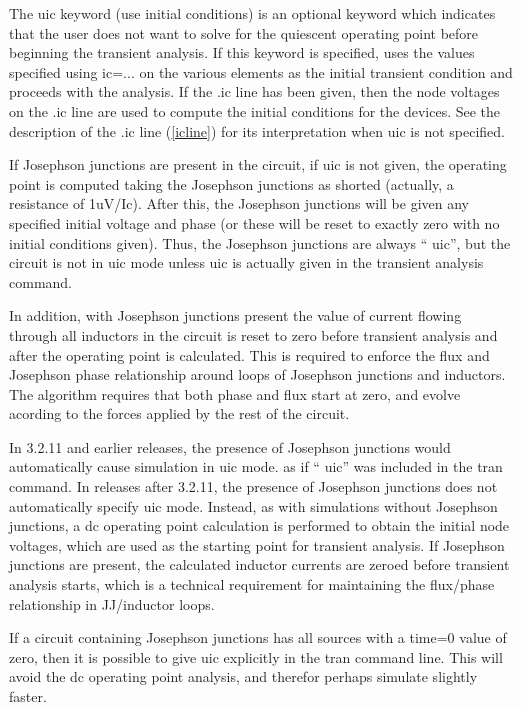 The {\vt uic} keyword (use initial conditions) is an optional keyword
which indicates that the user does not want {\WRspice} to solve for
the quiescent operating point before beginning the transient analysis. 
If this keyword is specified, {\WRspice} uses the values specified
using {\vt ic=}...  on the various elements as the initial transient
condition and proceeds with the analysis.  If the {\vt .ic} line has
been given, then the node voltages on the {\vt .ic} line are used to
compute the initial conditions for the devices.  See the description
of the {\vt .ic} line (\ref{icline}) for its interpretation when {\vt
uic} is not specified.

If Josephson junctions are present in the circuit, if {\vt uic} is not
given, the operating point is computed taking the Josephson junctions
as shorted (actually, a resistance of 1uV/Ic).  After this, the
Josephson junctions will be given any specified initial voltage and
phase (or these will be reset to exactly zero with no initial
conditions given).  Thus, the Josephson junctions are always ``{\vt
uic}'', but the circuit is not in {\vt uic} mode unless {\vt uic} is
actually given in the transient analysis command.

In addition, with Josephson junctions present the value of current
flowing through all inductors in the circuit is reset to zero before
transient analysis and after the operating point is calculated.  This
is required to enforce the flux and Josephson phase relationship
around loops of Josephson junctions and inductors.  The algorithm
requires that both phase and flux start at zero, and evolve acording
to the forces applied by the rest of the circuit.

In 3.2.11 and earlier releases, the presence of Josephson junctions
would automatically cause simulation in {\vt uic} mode.  as if ``{\vt
uic}'' was included in the {\vt tran} command.  In releases after
3.2.11, the presence of Josephson junctions does not automatically
specify {\vt uic} mode.  Instead, as with simulations without
Josephson junctions, a dc operating point calculation is performed to
obtain the initial node voltages, which are used as the starting point
for transient analysis.  If Josephson junctions are present, the
calculated inductor currents are zeroed before transient analysis
starts, which is a technical requirement for maintaining the
flux/phase relationship in JJ/inductor loops.

If a circuit containing Josephson junctions has all sources with a
time=0 value of zero, then it is possible to give {\vt uic} explicitly
in the {\vt tran} command line.  This will avoid the dc operating
point analysis, and therefor perhaps simulate slightly faster.

